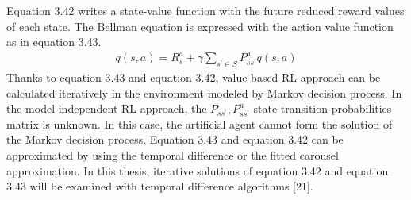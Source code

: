 \documentclass[12pt,twoside,a4]{mwbk}
\begin{document}
Equation 3.42 writes a state-value function with the future reduced reward values of each state. The Bellman equation is expressed with the action value function as in equation 3.43.
\begin{subequations}
\begin{align}
   q(s, a)=R_{s}^{a}+\gamma \sum_{s^{\prime} \in S} P_{s s^{\prime}}^{a} q(s, a)
\end{align}
\end{subequations}
Thanks to equation 3.43 and equation 3.42, value-based RL approach can be calculated iteratively in the environment modeled by Markov decision process. In the model-independent RL approach, the $P_{s s^{\prime}}, P_{s s^{\prime}}^{a}$ state transition probabilities matrix is unknown. In this case, the artificial agent cannot form the solution of the Markov decision process. Equation 3.43 and equation 3.42 can be approximated by using the temporal difference or the fitted carousel approximation. In this thesis, iterative solutions of equation 3.42 and equation 3.43 will be examined with temporal difference algorithms [21].
\end{document}
